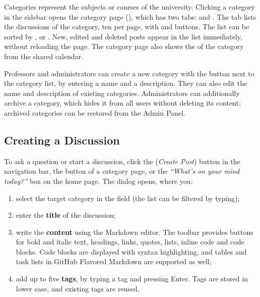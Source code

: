 Categories represent the subjects or courses of the university. Clicking a category in
the sidebar opens the category page (), which has two tabs:
 and . The  tab lists the discussions of the
category, ten per page, with  and  buttons. The list can be
sorted by ,  or . New, edited and deleted
posts appear in the list immediately, without reloading the page. The category page
also shows the  of the category from the shared calendar.

Professors and administrators can create a new category with the \ui{+} button next to
the category list, by entering a name and a description. They can also edit the name
and description of existing categories. Administrators can additionally archive a
category, which hides it from all users without deleting its content; archived
categories can be restored from the Admin Panel.


\subsection{Creating a Discussion}

To ask a question or start a discussion, click the \ui{+} (\emph{Create Post}) button in
the navigation bar, the  button of a category page, or the \emph{``What's on your mind today?''} box on the home page. The
 dialog opens, where you:

\begin{enumerate}
  \item select the target category in the  field (the list can be
    filtered by typing);
  \item enter the \textbf{title} of the discussion;
  \item write the \textbf{content} using the Markdown editor. The toolbar provides
    buttons for bold and italic text, headings, links, quotes, lists, inline code and
    code blocks. Code blocks are displayed with syntax highlighting, and tables and
    task lists in GitHub Flavored Markdown are supported as well;
  \item add up to five \textbf{tags}, by typing a tag and pressing Enter. Tags are
    stored in lower case, and existing tags are reused.
\end{enumerate}

